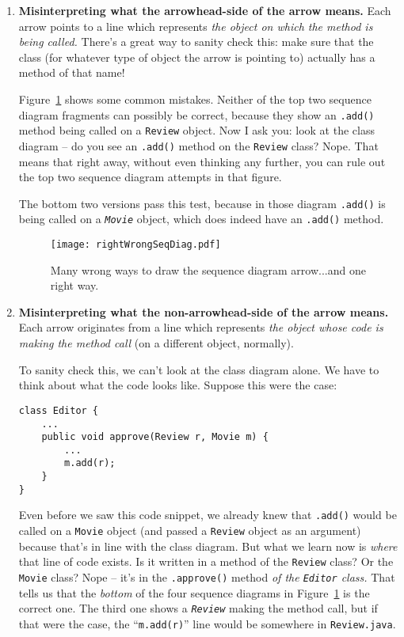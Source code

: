 \begin{enumerate}
\itemsep.1em
\item \textbf{Misinterpreting what the arrowhead-side of the arrow means.}
Each arrow points to a line which represents \textit{the object on which the
method is being called.} There's a great way to sanity check this: make sure
that the class (for whatever type of object the arrow is pointing to) actually
has a method of that name!

Figure~\ref{fig:rightWrongSeqDiag} shows some common mistakes. Neither of the
top two sequence diagram fragments can possibly be correct, because they show
an \texttt{.add()} method being called on a \texttt{Review} object. Now I ask
you: look at the class diagram -- do you see an \texttt{.add()} method on the
\texttt{Review} class? Nope. That means that right away, without even thinking
any further, you can rule out the top two sequence diagram attempts in that
figure.

The bottom two versions pass this test, because in those diagram
\texttt{.add()} is being called on a \textit{\texttt{Movie}} object, which
does indeed have an \texttt{.add()} method.

\begin{figure}
\centering
\texttt{[image: rightWrongSeqDiag.pdf]}  %
\caption{Many wrong ways to draw the sequence diagram arrow...and one right
way.}
\label{fig:rightWrongSeqDiag}
\end{figure}

\item \textbf{Misinterpreting what the non-arrowhead-side of the arrow means.}
Each arrow originates from a line which represents \textit{the object whose
code is making the method call} (on a different object, normally). 

To sanity check this, we can't look at the class diagram alone. We have to
think about what the code looks like. Suppose this were the case:

\begin{Verbatim}[fontsize=\small,samepage=true,frame=single]
class Editor {
    ...
    public void approve(Review r, Movie m) {
        ...
        m.add(r);
    }
}
\end{Verbatim}

Even before we saw this code snippet, we already knew that \texttt{.add()}
would be called on a \texttt{Movie} object (and passed a \texttt{Review}
object as an argument) because that's in line with the class diagram. But what
we learn now is \textit{where} that line of code exists. Is it written in a
method of the \texttt{Review} class? Or the \texttt{Movie} class? Nope -- it's
in the \texttt{.approve()} method \textit{of the \texttt{Editor} class.} That
tells us that the \textit{bottom} of the four sequence diagrams in
Figure~\ref{fig:rightWrongSeqDiag} is the correct one. The third one shows a
\textit{\texttt{Review}} making the method call, but if that were the case,
the ``\texttt{m.add(r)}'' line would be somewhere in \texttt{Review.java}.

\end{enumerate}

